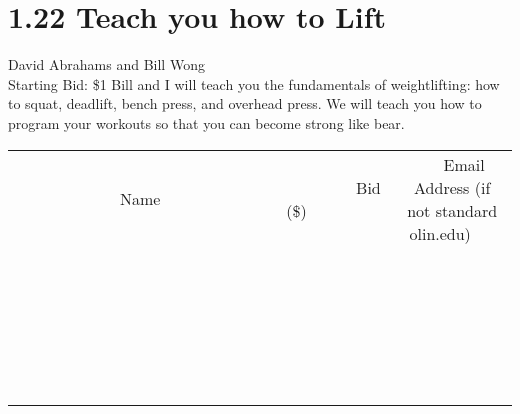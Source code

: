 \documentclass[11pt]{article}
\begin{document}
\section*{1.22 Teach you how to Lift}
David Abrahams and Bill Wong
\\
Starting Bid: \$1
\newline
Bill and I will teach you the fundamentals of weightlifting: how to squat, deadlift, bench press, and overhead press. We will teach you how to program your workouts so that you can become strong like bear.
\\[6ex]
\begin{tabular}{c c c}
~~~~~~~~~~~~~Name~~~~~~~~~~~~~ & ~~~~~~~~~Bid (\$)~~~~~~~~~  & ~~~Email Address (if not standard olin.edu)~~~\\
 & & \\
\hline
 & & \\
\hline
 & & \\
\hline
 & & \\
\hline
 & & \\
\hline
 & & \\
\hline
 & & \\
\hline
 & & \\
\hline
 & & \\
\hline
 & & \\
\hline
 & & \\
\hline
 & & \\
\hline
 & & \\
\hline
 & & \\
\hline
 & & \\
\hline
 & & \\
\hline
 & & \\
\hline
 & & \\
\hline
 & & \\
\hline
 & & \\
\hline
 & & \\
\hline
 & & \\
\hline
 & & \\
\hline
 & & \\
\hline
 & & \\
\hline
 & & \\
\hline
\end{tabular}
\newpage
\end{document}
